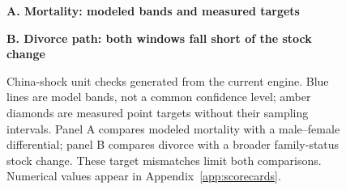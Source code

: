 \begin{figure}[t]
\centering
\scorelegend\par\medskip
\textbf{A. Mortality: modeled bands and measured targets}\par\smallskip

\par\bigskip
\textbf{B. Divorce path: both windows fall short of the stock change}\par\smallskip

\caption{China-shock unit checks generated from the current engine.
Blue lines are model bands, not a common confidence level; amber diamonds
are measured point targets without their sampling intervals. Panel A compares
modeled mortality with a male--female differential; panel B compares divorce
with a broader family-status stock change. These target mismatches limit both
comparisons. Numerical values appear in Appendix~\ref{app:scorecards}.}
\label{fig:unit-checks}
\end{figure}
